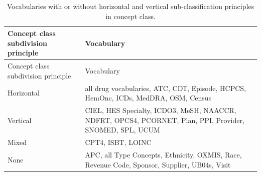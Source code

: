 \documentclass[11pt]{book}
\theoremstyle{definition}
\theoremstyle{definition}
\theoremstyle{definition}
\theoremstyle{remark}
\begin{document}
\begin{longtable}[]{@{}ll@{}}
\caption{\label{tab:sublassification} Vocabularies with or without
horizontal and vertical sub-classification principles in concept
class.}\tabularnewline
\toprule
\begin{minipage}[b]{0.13\columnwidth}\raggedright\strut
Concept class subdivision principle\strut
\end{minipage} & \begin{minipage}[b]{0.47\columnwidth}\raggedright\strut
Vocabulary\strut
\end{minipage}\tabularnewline
\midrule
\endfirsthead
\toprule
\begin{minipage}[b]{0.13\columnwidth}\raggedright\strut
Concept class subdivision principle\strut
\end{minipage} & \begin{minipage}[b]{0.47\columnwidth}\raggedright\strut
Vocabulary\strut
\end{minipage}\tabularnewline
\midrule
\endhead
\begin{minipage}[t]{0.13\columnwidth}\raggedright\strut
Horizontal\strut
\end{minipage} & \begin{minipage}[t]{0.47\columnwidth}\raggedright\strut
all drug vocabularies, ATC, CDТ, Episode, HCPCS, HemOnc, ICDs, MedDRA,
OSM, Census\strut
\end{minipage}\tabularnewline
\begin{minipage}[t]{0.13\columnwidth}\raggedright\strut
Vertical\strut
\end{minipage} & \begin{minipage}[t]{0.47\columnwidth}\raggedright\strut
CIEL, HES Specialty, ICDO3, MeSH, NAACCR, NDFRT, OPCS4, PCORNET, Plan,
PPI, Provider, SNOMED, SPL, UCUM\strut
\end{minipage}\tabularnewline
\begin{minipage}[t]{0.13\columnwidth}\raggedright\strut
Mixed\strut
\end{minipage} & \begin{minipage}[t]{0.47\columnwidth}\raggedright\strut
CPT4, ISBT, LOINC\strut
\end{minipage}\tabularnewline
\begin{minipage}[t]{0.13\columnwidth}\raggedright\strut
None\strut
\end{minipage} & \begin{minipage}[t]{0.47\columnwidth}\raggedright\strut
APC, all Type Concepts, Ethnicity, OXMIS, Race, Revenue Code, Sponsor,
Supplier, UB04s, Visit\strut
\end{minipage}\tabularnewline
\bottomrule
\end{longtable}
\end{document}
